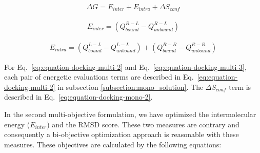 \begin{equation}
\label{eq:equation-docking-multi-1}
\begin{split}
\Delta G = E_{inter} + E_{intra} + \Delta S_{conf}
\end{split}
\end{equation}

\begin{equation}
\label{eq:equation-docking-multi-2}
\begin{split}
E_{inter} = (Q_{bound}^{R-L} - Q_{unbound}^{R-L})
\end{split}
\end{equation}

\begin{equation}
\label{eq:equation-docking-multi-3}
\begin{split}
E_{intra} = (Q_{bound}^{L-L} - Q_{unbound}^{L-L}) + (Q_{bound}^{R-R} - Q_{unbound}^{R-R}) 
\end{split}
\end{equation}

For Eq.~\ref{eq:equation-docking-multi-2} and Eq.~\ref{eq:equation-docking-multi-3}, each pair of energetic evaluations terms are described in Eq.~\ref{eq:equation-docking-multi-2} in  subsection \ref{subsection:mono_solution}. The $\Delta S_{conf}$ term is described in Eq.~\ref{eq:equation-docking-mono-2}.

In the second multi-objective formulation, we have optimized the intermolecular energy ($E_{inter}$) and the RMSD score. These two measures are contrary and consequently a bi-objective optimization approach is reasonable with these measures. These objectives are calculated by the following equations:


